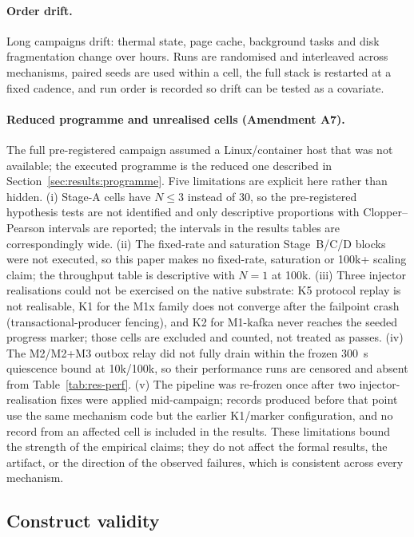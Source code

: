 \paragraph{Order drift.} Long campaigns drift: thermal state, page cache, background tasks and
disk fragmentation change over hours. Runs are randomised and interleaved across mechanisms,
paired seeds are used within a cell, the full stack is restarted at a fixed cadence, and run
order is recorded so drift can be tested as a covariate.

\paragraph{Reduced programme and unrealised cells (Amendment A7).} The full pre-registered
campaign assumed a Linux/container host that was not available; the executed programme is the
reduced one described in Section~\ref{sec:results:programme}. Five limitations are explicit here
rather than hidden. (i) Stage-A cells have $N\le3$ instead of 30, so the pre-registered hypothesis
tests are not identified and only descriptive proportions with Clopper--Pearson intervals are
reported; the intervals in the results tables are correspondingly wide. (ii) The fixed-rate and
saturation Stage~B/C/D blocks were not executed, so this paper makes no fixed-rate, saturation or
100k+ scaling claim; the throughput table is descriptive with $N=1$ at 100k. (iii) Three injector
realisations could not be exercised on the native substrate: K5 protocol replay is not realisable,
K1 for the M1x family does not converge after the failpoint crash (transactional-producer
fencing), and K2 for M1-kafka never reaches the seeded progress marker; those cells are excluded
and counted, not treated as passes. (iv) The M2/M2+M3 outbox relay did not fully drain within the
frozen 300~s quiescence bound at 10k/100k, so their performance runs are censored and absent from
Table~\ref{tab:res-perf}. (v) The pipeline was re-frozen once after two injector-realisation fixes
were applied mid-campaign; records produced before that point use the same mechanism code but the
earlier K1/marker configuration, and no record from an affected cell is included in the results.
These limitations bound the strength of the empirical claims; they do not affect the formal
results, the artifact, or the direction of the observed failures, which is consistent across every
mechanism.

\subsection{Construct validity}
\label{sec:threats-construct}

